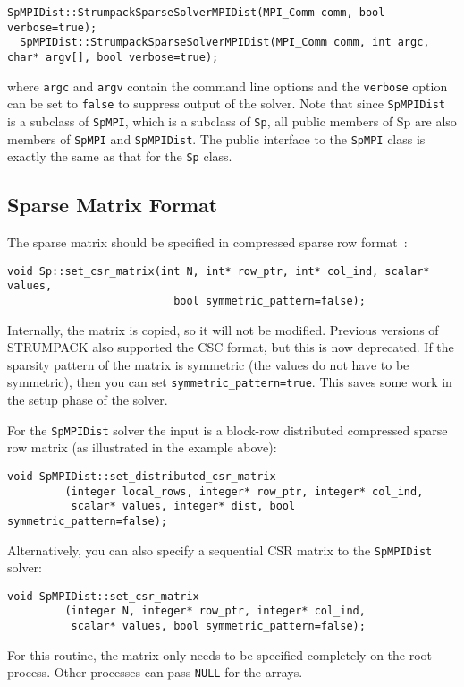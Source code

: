 \documentclass{article}
\begin{document}
\begin{lstlisting}[style=C]
  SpMPIDist::StrumpackSparseSolverMPIDist(MPI_Comm comm, bool verbose=true);
  SpMPIDist::StrumpackSparseSolverMPIDist(MPI_Comm comm, int argc, char* argv[], bool verbose=true);
\end{lstlisting}
where \lstinline[style=C]!argc! and \lstinline[style=C]!argv! contain
the command line options and the \lstinline[style=C]!verbose! option
can be set to \lstinline[style=C]!false! to suppress output of the
solver. Note that since \lstinline[style=C]!SpMPIDist! is a subclass
of \lstinline[style=C]!SpMPI!, which is a subclass of
\lstinline[style=C]!Sp!, all public members of Sp are also members of
\lstinline[style=C]!SpMPI! and \lstinline[style=C]!SpMPIDist!. The
public interface to the \lstinline[style=C]!SpMPI! class is exactly
the same as that for the \lstinline[style=C]!Sp! class.

\subsection{Sparse Matrix Format}
The sparse matrix should be specified in compressed sparse row
format~\cite{saad2003iterative}:
\begin{lstlisting}[style=C]
  void Sp::set_csr_matrix(int N, int* row_ptr, int* col_ind, scalar* values,
                          bool symmetric_pattern=false);
\end{lstlisting}
Internally, the matrix is copied, so it will not be modified. Previous
versions of STRUMPACK also supported the CSC format, but this is now
deprecated. If the sparsity pattern of the matrix is symmetric (the
values do not have to be symmetric), then you can set
\lstinline[style=C]!symmetric_pattern=true!. This saves some work in
the setup phase of the solver.

For the \lstinline[style=C]!SpMPIDist! solver the input is a block-row
distributed compressed sparse row matrix (as illustrated in the
example above):
\begin{lstlisting}[style=C]
  void SpMPIDist::set_distributed_csr_matrix
         (integer local_rows, integer* row_ptr, integer* col_ind,
          scalar* values, integer* dist, bool symmetric_pattern=false);
\end{lstlisting}
Alternatively, you can also specify a sequential CSR matrix to the
\lstinline[style=C]!SpMPIDist! solver:
\begin{lstlisting}[style=C]
  void SpMPIDist::set_csr_matrix
         (integer N, integer* row_ptr, integer* col_ind,
          scalar* values, bool symmetric_pattern=false);
\end{lstlisting}
For this routine, the matrix only needs to be specified completely on
the root process. Other processes can pass \lstinline[style=C]!NULL!
for the arrays.
\end{document}
